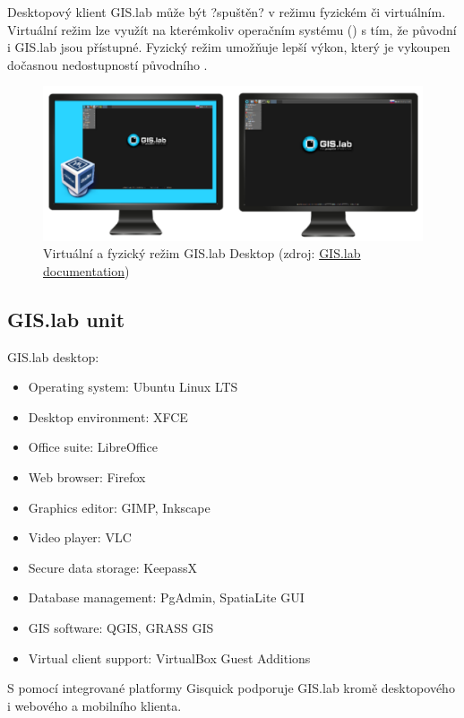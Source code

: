 Desktopový klient GIS.lab může být ?spuštěn? v režimu fyzickém či virtuálním. Virtuální režim lze využít na kterémkoliv operačním systému () s tím, že původní  i GIS.lab jsou přístupné. Fyzický režim umožňuje lepší výkon, který je vykoupen dočasnou nedostupností původního .

\begin{figure}[H] \centering
    \includegraphics[width=450pt]{./pictures/physical-or-virtual-mode.png}
    \caption[Virtuální a fyzický režim GIS.lab Desktop]{Virtuální a fyzický režim GIS.lab Desktop (zdroj:
	\href{https://gislab.readthedocs.io/en/latest/_images/physical-or-virtual-mode.png}{GIS.lab documentation})}
	\label{fig:gislab-rezim}
\end{figure}

\subsection{GIS.lab unit}

GIS.lab desktop:
\begin{itemize}
\item Operating system: Ubuntu Linux LTS
\item Desktop environment: XFCE
\item Office suite: LibreOffice
\item Web browser: Firefox
\item Graphics editor: GIMP, Inkscape
\item Video player: VLC
\item Secure data storage: KeepassX
\item Database management: PgAdmin, SpatiaLite GUI
\item GIS software: QGIS, GRASS GIS
\item Virtual client support: VirtualBox Guest Additions
\end{itemize}

S pomocí integrované platformy Gisquick podporuje GIS.lab kromě desktopového i webového a mobilního klienta. 

